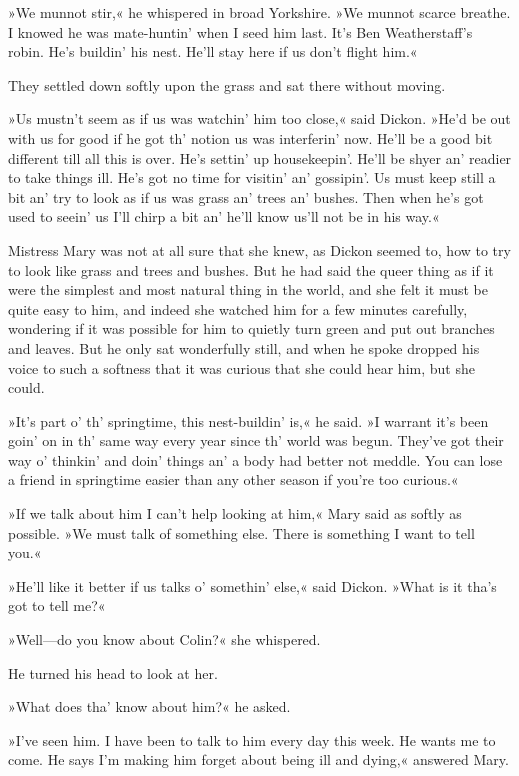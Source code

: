 »We munnot stir,« he whispered in broad Yorkshire. »We munnot scarce breathe. I knowed he was mate-huntin' when I seed him last. It's Ben Weatherstaff's robin. He's buildin' his nest. He'll stay here if us don't flight him.«

They settled down softly upon the grass and sat there without moving.

»Us mustn't seem as if us was watchin' him too close,« said Dickon. »He'd be out with us for good if he got th' notion us was interferin' now. He'll be a good bit different till all this is over. He's settin' up housekeepin'. He'll be shyer an' readier to take things ill. He's got no time for visitin' an' gossipin'. Us must keep still a bit an' try to look as if us was grass an' trees an' bushes. Then when he's got used to seein' us I'll chirp a bit an' he'll know us'll not be in his way.«

Mistress Mary was not at all sure that she knew, as Dickon seemed to, how to try to look like grass and trees and bushes. But he had said the queer thing as if it were the simplest and most natural thing in the world, and she felt it must be quite easy to him, and indeed she watched him for a few minutes carefully, wondering if it was possible for him to quietly turn green and put out branches and leaves. But he only sat wonderfully still, and when he spoke dropped his voice to such a softness that it was curious that she could hear him, but she could.

»It's part o' th' springtime, this nest-buildin' is,« he said. »I warrant it's been goin' on in th' same way every year since th' world was begun. They've got their way o' thinkin' and doin' things an' a body had better not meddle. You can lose a friend in springtime easier than any other season if you're too curious.«

»If we talk about him I can't help looking at him,« Mary said as softly as possible. »We must talk of something else. There is something I want to tell you.«

»He'll like it better if us talks o' somethin' else,« said Dickon. »What is it tha's got to tell me?«

»Well—do you know about Colin?« she whispered.

He turned his head to look at her.

»What does tha' know about him?« he asked.

»I've seen him. I have been to talk to him every day this week. He wants me to come. He says I'm making him forget about being ill and dying,« answered Mary.

